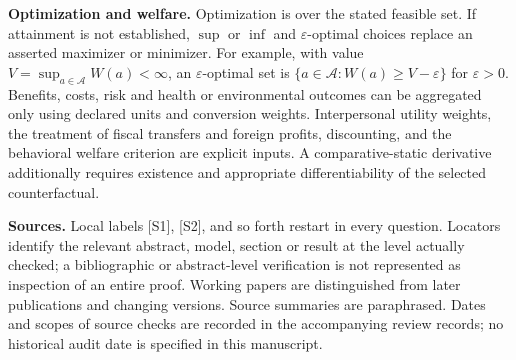 \documentclass[11pt,a4paper]{article}
\begin{document}
\textbf{Optimization and welfare.} Optimization is over the stated feasible set. If attainment is not established, $\sup$ or $\inf$ and $\varepsilon$-optimal choices replace an asserted maximizer or minimizer. For example, with value $V=\sup_{a\in\mathcal A}W(a)<\infty$, an $\varepsilon$-optimal set is $\{a\in\mathcal A:W(a)\geq V-\varepsilon\}$ for $\varepsilon>0$. Benefits, costs, risk and health or environmental outcomes can be aggregated only using declared units and conversion weights. Interpersonal utility weights, the treatment of fiscal transfers and foreign profits, discounting, and the behavioral welfare criterion are explicit inputs. A comparative-static derivative additionally requires existence and appropriate differentiability of the selected counterfactual.

\textbf{Sources.} Local labels [S1], [S2], and so forth restart in every question. Locators identify the relevant abstract, model, section or result at the level actually checked; a bibliographic or abstract-level verification is not represented as inspection of an entire proof. Working papers are distinguished from later publications and changing versions. Source summaries are paraphrased. Dates and scopes of source checks are recorded in the accompanying review records; no historical audit date is specified in this manuscript.
\end{document}
